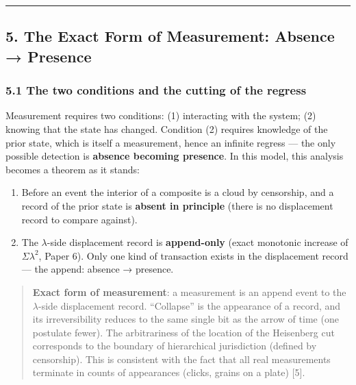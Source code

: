 \documentclass[
]{ltjsarticle}
\providecommand{\tightlist}{%
  \setlength{\itemsep}{0pt}\setlength{\parskip}{0pt}}
\begin{document}
\begin{center}\rule{0.5\linewidth}{0.5pt}\end{center}

\subsection{5. The Exact Form of Measurement: Absence →
Presence}\label{the-exact-form-of-measurement-absence-presence}

\subsubsection{5.1 The two conditions and the cutting of the
regress}\label{the-two-conditions-and-the-cutting-of-the-regress}

Measurement requires two conditions: (1) interacting with the system;
(2) knowing that the state has changed. Condition (2) requires knowledge
of the prior state, which is itself a measurement, hence an infinite
regress --- the only possible detection is \textbf{absence becoming
presence}. In this model, this analysis becomes a theorem as it stands:

\begin{enumerate}
\def\labelenumi{\arabic{enumi}.}
\tightlist
\item
  Before an event the interior of a composite is a cloud by censorship,
  and a record of the prior state is \textbf{absent in principle} (there
  is no displacement record to compare against).
\item
  The \(\lambda\)-side displacement record is \textbf{append-only}
  (exact monotonic increase of \(\Sigma\lambda^2\), Paper 6). Only one
  kind of transaction exists in the displacement record --- the append:
  absence → presence.
\end{enumerate}

\begin{quote}
\textbf{Exact form of measurement}: a measurement is an append event to
the \(\lambda\)-side displacement record. ``Collapse'' is the appearance
of a record, and its irreversibility reduces to the same single bit as
the arrow of time (one postulate fewer). The arbitrariness of the
location of the Heisenberg cut corresponds to the boundary of
hierarchical jurisdiction (defined by censorship). This is consistent
with the fact that all real measurements terminate in counts of
appearances (clicks, grains on a plate) {[}5{]}.
\end{quote}
\end{document}
